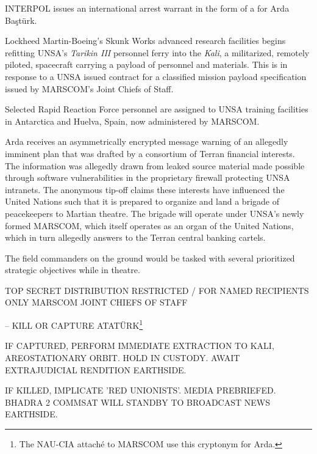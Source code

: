 INTERPOL issues an international arrest warrant in the form of a  for Arda Baştürk.
\StopTimelineDate

Lockheed Martin-Boeing's Skunk Works advanced research facilities begins refitting UNSA's {\it Tarikin III} personnel ferry into the {\it Kali}, a militarized, remotely piloted, spacecraft carrying a payload of personnel and materials. This is in response to a UNSA issued contract for a classified mission payload specification issued by MARSCOM's Joint Chiefs of Staff.
\StopTimelineDate

Selected Rapid Reaction Force personnel are assigned to UNSA training facilities in Antarctica and Huelva, Spain, now administered by MARSCOM.
\StopTimelineDate

Arda receives an asymmetrically encrypted message warning of an allegedly imminent plan that was drafted by a consortium of Terran financial interests. The information was allegedly drawn from leaked source material made possible through software vulnerabilities in the proprietary firewall protecting UNSA intranets. The anonymous tip-off claims these interests have influenced the United Nations such that it is prepared to organize and land a brigade of peacekeepers to Martian theatre. The brigade will operate under UNSA's newly formed MARSCOM, which itself operates as an organ of the United Nations, which in turn allegedly answers to the Terran central banking cartels. 

The field commanders on the ground would be tasked with several prioritized strategic objectives while in theatre. 

\startTimelineCorrespondenceDocument
TOP SECRET
DISTRIBUTION RESTRICTED / FOR NAMED RECIPIENTS ONLY
MARSCOM JOINT CHIEFS OF STAFF
\startitemize[4]
\item {} -- KILL OR CAPTURE ATATÜRK\footnote{The NAU-CIA attaché to MARSCOM use this cryptonym for Arda.}

    \startitemize[n]
    \item IF CAPTURED, PERFORM IMMEDIATE EXTRACTION TO KALI, AREOSTATIONARY ORBIT. HOLD IN CUSTODY. AWAIT EXTRAJUDICIAL RENDITION EARTHSIDE.
    \item IF KILLED, IMPLICATE 'RED UNIONISTS'. MEDIA PREBRIEFED. BHADRA 2 COMMSAT WILL STANDBY TO BROADCAST NEWS EARTHSIDE.
    \stopitemize

